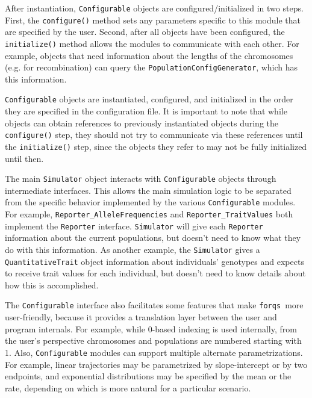 \documentclass{article}
\newcommand{\forqs}[0]{\texttt{forqs }}
\begin{document}
\begin{sloppypar}
After instantiation, \texttt{Configurable} objects are configured/initialized in
two steps.  First, the \texttt{configure()} method sets any parameters specific
to this module that are specified by the user.  Second, after all objects have been 
configured, the \texttt{initialize()} method allows the modules to communicate with
each other.  For example, objects that need information about the lengths of
the chromosomes (e.g. for recombination) can query the 
\texttt{PopulationConfigGenerator}, which has this information.
\end{sloppypar}

\texttt{Configurable} objects are instantiated, configured, and initialized in the 
order they are specified in the configuration file.  It is important to note that
while objects can obtain references to previously instantiated objects during
the \texttt{configure()} step, they should not try to communicate via these
references until the \texttt{initialize()} step, since the objects they refer to
may not be fully initialized until then.

\begin{sloppypar}
The main \texttt{Simulator} object interacts with \texttt{Configurable} objects
through intermediate interfaces.  This allows the main simulation logic to be
separated from the specific behavior implemented by the various
\texttt{Configurable} modules.  For example,
\texttt{Reporter\_AlleleFrequencies} and \texttt{Reporter\_TraitValues} both
implement the \texttt{Reporter} interface.  \texttt{Simulator} will give each
\texttt{Reporter} information about the current populations, but doesn't need
to know what they do with this information.  As another example, the
\texttt{Simulator} gives a \texttt{QuantitativeTrait} object information about
individuals' genotypes and expects to receive trait values for each individual,
but doesn't need to know details about how this is accomplished.
\end{sloppypar}

The \texttt{Configurable} interface also facilitates some features that make
\forqs more user-friendly, because it provides a translation layer between the
user and program internals.  For example, while 0-based indexing is used
internally, from the user's perspective chromosomes and populations are
numbered starting with 1.  Also, \texttt{Configurable} modules can support
multiple alternate parametrizations.  For example, linear trajectories may be
parametrized by slope-intercept or by two endpoints, and exponential distributions
may be specified by the mean or the rate, depending on which is
more natural for a particular scenario.
\end{document}
